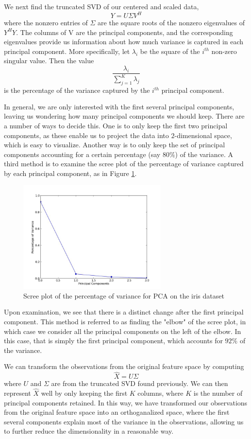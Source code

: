 We next find the truncated SVD of our centered and scaled data, $$Y = U\Sigma V^{H}$$ where the nonzero entries of $\Sigma$ are the square roots of the nonzero eigenvalues of $Y^{H}Y$. The columns of V are the principal components, and the corresponding eigenvalues provide us information about how much variance is captured in each principal component. More specifically, let $\lambda_{i}$ be the square of the $i^{th}$ non-zero singular value. Then the value $$\frac{\lambda_{i}}{\sum_{j=1}^{K} \lambda_{j}}$$ is the percentage of the variance captured by the $i^{th}$ principal component.

In general, we are only interested with the first several principal components, leaving us wondering how many principal components we should keep. There are a number of ways to decide this. One is to only keep the first two principal components, as these enable us to project the data into $2$-dimensional space, which is easy to visualize. Another way is to only keep the set of principal components accounting for a certain percentage (say $80\%$) of the variance. A third method is to examine the scree plot of the percentage of variance captured by each principal component, as in Figure \ref{scree}.

\begin{figure}\label{scree}
\centering
\includegraphics[width=7.5cm]{scree.jpg}
\caption{Scree plot of the percentage of variance for PCA on the iris dataset}
\end{figure}

Upon examination, we see that there is a distinct change after the first principal component. This method is referred to as finding the "elbow" of the scree plot, in which case we consider all the principal components on the left of the elbow. In this case, that is simply the first principal component, which accounts for $92\%$ of the variance.

We can transform the observations from the original feature space by computing $$\widehat{X} = U\Sigma$$ where $U$ and $\Sigma$ are from the truncated SVD found previously. We can then represent $\widehat{X}$ well by only keeping the first $K$ columns, where $K$ is the number of principal components retained. In this way, we have transformed our observations from the original feature space into an orthoganalized space, where the first several components explain most of the variance in the observations, allowing us to further reduce the dimensionality in a reasonable way.

